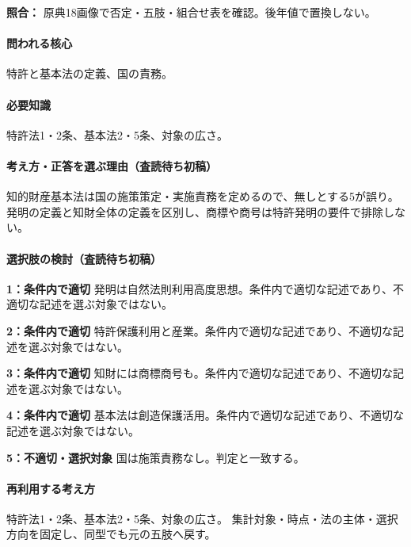 \noindent\textbf{照合：} 原典18画像で否定・五肢・組合せ表を確認。後年値で置換しない。\par

\paragraph{問われる核心} 特許と基本法の定義、国の責務。

\paragraph{必要知識} 特許法1・2条、基本法2・5条、対象の広さ。

\paragraph{考え方・正答を選ぶ理由（査読待ち初稿）} 知的財産基本法は国の施策策定・実施責務を定めるので、無しとする5が誤り。発明の定義と知財全体の定義を区別し、商標や商号は特許発明の要件で排除しない。

\paragraph{選択肢の検討（査読待ち初稿）}\mbox{}\par

\noindent\textbf{1：条件内で適切} 発明は自然法則利用高度思想。条件内で適切な記述であり、不適切な記述を選ぶ対象ではない。\par

\noindent\textbf{2：条件内で適切} 特許保護利用と産業。条件内で適切な記述であり、不適切な記述を選ぶ対象ではない。\par

\noindent\textbf{3：条件内で適切} 知財には商標商号も。条件内で適切な記述であり、不適切な記述を選ぶ対象ではない。\par

\noindent\textbf{4：条件内で適切} 基本法は創造保護活用。条件内で適切な記述であり、不適切な記述を選ぶ対象ではない。\par

\noindent\textbf{5：不適切・選択対象} 国は施策責務なし。判定と一致する。\par

\paragraph{再利用する考え方} 特許法1・2条、基本法2・5条、対象の広さ。 集計対象・時点・法の主体・選択方向を固定し、同型でも元の五肢へ戻す。

